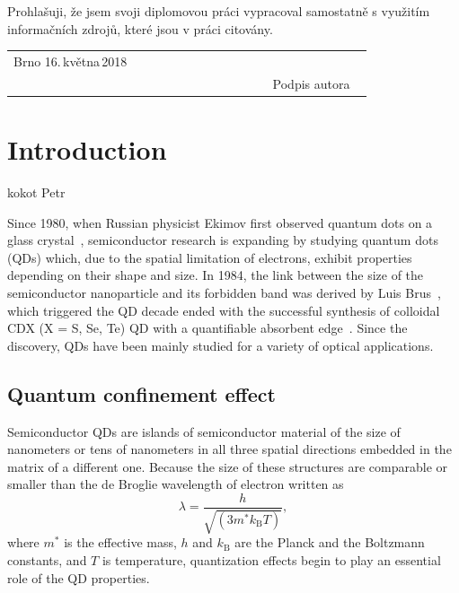 \documentclass[
a4paper, %
11pt, %
onecolumn, %
openany, %
oldfontcommands,
]{memoir}
\begin{document}
\noindent Prohlašuji, že jsem svoji diplomovou práci vypracoval samostatně
s využitím informačních zdrojů, které jsou v práci citovány.
\vspace{1cm}
\begin{center}
	\centering
	\begin{tabular}{p{0.5\linewidth}p{0.15\linewidth}p{0.25\linewidth}}
		Brno 16.\,května\,2018 &  & \\\cmidrule[0.5pt]{3-3}
		&&\centering Podpis autora \\ 
	\end{tabular}
\end{center}

\newpage



\pagestyle{standard}

\tableofcontents*


\clearpage




\chapter{Introduction}\label{chap:introduction}
kokot Petr

Since 1980, when Russian physicist Ekimov first observed quantum dots on a glass crystal~\cite{Ekimov}, semiconductor research is expanding by studying quantum dots (QDs) which, due to the spatial limitation of electrons, exhibit properties depending on their shape and size. In 1984, the link between the size of the semiconductor nanoparticle and its forbidden band was derived by Luis Brus~\cite{Brus}, which triggered the QD decade ended with the successful synthesis of colloidal CDX (X = S, Se, Te) QD with a quantifiable absorbent edge~\cite{Murray}. Since the discovery, QDs have been mainly studied for a variety of optical applications. %

\section{Quantum confinement effect}
Semiconductor QDs are islands of semiconductor material of the size of nanometers or tens of nanometers in all three spatial directions embedded in the matrix of a different one. Because the size of these structures are comparable or smaller than the de Broglie wavelength of electron written as
\begin{equation}
\lambda=\frac{h}{\sqrt{(3m^*k_\mathrm{B}T)}},
\end{equation}
where $m^*$ is the effective mass, $h$ and $k_\mathrm{B}$ are the Planck and the Boltzmann constants, and $T$ is temperature, quantization effects begin to play an essential role of the QD properties. 
\end{document}
